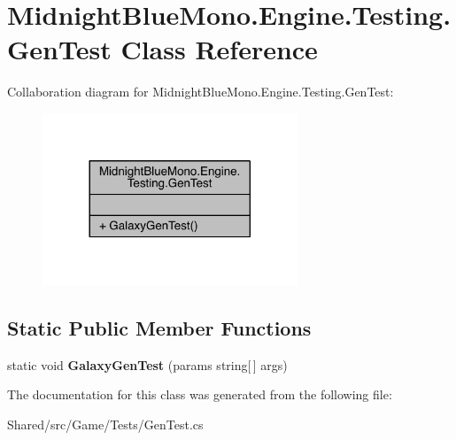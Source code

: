 \hypertarget{class_midnight_blue_mono_1_1_engine_1_1_testing_1_1_gen_test}{}\section{Midnight\+Blue\+Mono.\+Engine.\+Testing.\+Gen\+Test Class Reference}
\label{class_midnight_blue_mono_1_1_engine_1_1_testing_1_1_gen_test}


Collaboration diagram for Midnight\+Blue\+Mono.\+Engine.\+Testing.\+Gen\+Test\+:
\nopagebreak
\begin{figure}[H]
\begin{center}
\leavevmode
\includegraphics[width=216pt]{class_midnight_blue_mono_1_1_engine_1_1_testing_1_1_gen_test__coll__graph}
\end{center}
\end{figure}
\subsection*{Static Public Member Functions}
\begin{DoxyCompactItemize}
\item 
\hypertarget{class_midnight_blue_mono_1_1_engine_1_1_testing_1_1_gen_test_a8a210dcede07b5df5dc9149e34d23413}{}\label{class_midnight_blue_mono_1_1_engine_1_1_testing_1_1_gen_test_a8a210dcede07b5df5dc9149e34d23413} 
static void {\bfseries Galaxy\+Gen\+Test} (params string\mbox{[}$\,$\mbox{]} args)
\end{DoxyCompactItemize}


The documentation for this class was generated from the following file\+:\begin{DoxyCompactItemize}
\item 
Shared/src/\+Game/\+Tests/Gen\+Test.\+cs\end{DoxyCompactItemize}
